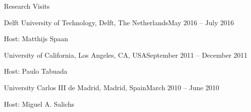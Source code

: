 
\begin{rSection}{Research Visits}

\begin{rSubsection}{Delft University of Technology, Delft, The Netherlands}{May 2016 -- July 2016}{}{}
\item Host: Matthijs Spaan
\end{rSubsection}

\begin{rSubsection}{University of California, Los Angeles, CA, USA}{September 2011 -- December 2011}{}{}
\item Host: Paulo Tabuada
\end{rSubsection}

\begin{rSubsection}{University Carlos III de Madrid, Madrid, Spain}{March 2010 -- June 2010}{}{}
\item Host: Miguel A. Salichs
\end{rSubsection}

\end{rSection}
